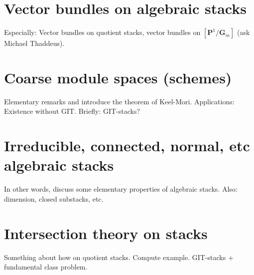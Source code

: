 \section{Vector bundles on algebraic stacks}
\label{section-vectorbundles}

\noindent
Especially: Vector bundles on quotient stacks,
vector bundles on $[\mathbf{P}^1/\mathbf{G}_m]$ (ask Michael Thaddeus).


\section{Coarse module spaces (schemes)}
\label{section-coarse}

\noindent
Elementary remarks and introduce the theorem of Keel-Mori.
Applications: Existence without GIT.
Briefly: GIT-stacks?


\section{Irreducible, connected, normal, etc algebraic stacks}
\label{section-elementary-properties}

\noindent
In other words, discuss some elementary properties of algebraic stacks.
Also: dimension, closed substacks, etc.


\section{Intersection theory on stacks}
\label{section-intersection-theory}

\noindent
Something about how on quotient stacks.
Compute example.
GIT-stacks + fundamental class problem.









